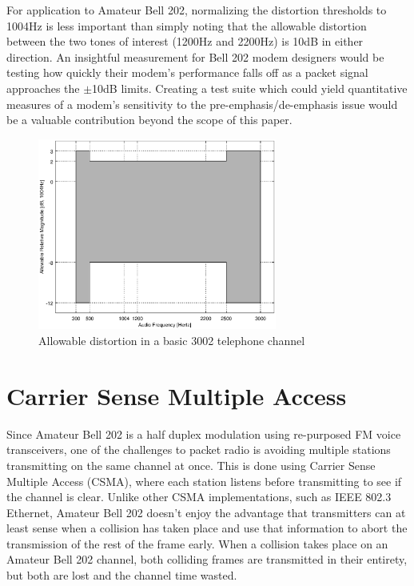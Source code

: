 For application to Amateur Bell 202, 
normalizing the distortion thresholds to 1004Hz is 
less important than simply noting that the allowable distortion between the two
tones of interest (1200Hz and 2200Hz) is 10dB in either direction.
An insightful measurement for Bell 202 modem designers would be testing how
quickly their modem's performance falls off as a packet signal approaches 
the $\pm$10dB limits.
Creating a test suite which could yield quantitative
measures of a modem's sensitivity to the pre-emphasis/de-emphasis issue would
be a valuable contribution beyond the scope of this paper.

\begin{figure}
	\centering
	\includegraphics[width=0.7\textwidth]{src/octave/3002}
	\caption{Allowable distortion in a basic 3002 telephone channel}
	\label{fig:3002}
\end{figure}


\section{Carrier Sense Multiple Access}
\label{sec:bell202csma}

Since Amateur Bell 202 is a half duplex modulation using re-purposed 
FM voice transceivers, 
one of the challenges to packet radio is avoiding multiple stations
transmitting on the same channel at once. 
This is done using Carrier Sense Multiple Access (CSMA),
where each station listens before transmitting to see if the channel is clear.
Unlike other CSMA implementations,
such as IEEE 802.3 Ethernet, 
Amateur Bell 202 doesn't enjoy the advantage that transmitters can
at least sense when a collision has taken place 
and use that information to abort the transmission of the rest of the frame early.
When a collision takes place on an Amateur Bell 202 channel, 
both colliding frames are transmitted in their entirety, but both are lost
and the channel time wasted.

